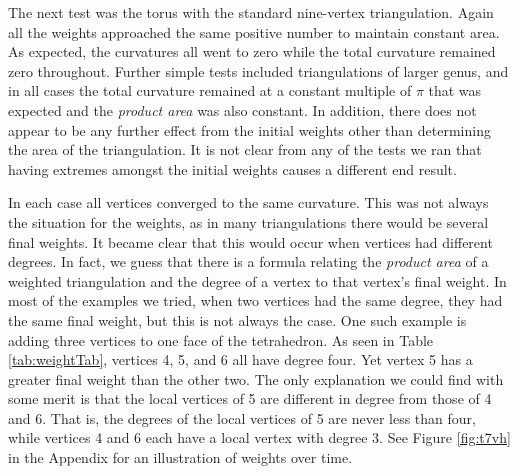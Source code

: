 \documentclass[12pt]{article}
\begin{document}
\noindent The next test was the torus with the standard nine-vertex triangulation. Again all the weights approached the same positive number to maintain constant area. As expected, the curvatures all went to zero while the total curvature remained zero throughout. Further simple tests included triangulations of larger genus, and in all cases the total curvature remained at a constant multiple of $\pi$ that was expected and the \textit{product area} was also constant. In addition, there does not appear to be any further effect from the initial weights other than determining the area of the triangulation. It is not clear from any of the tests we ran that having extremes amongst the initial weights causes a different end result.\newline

\noindent In each case all vertices converged to the same curvature. This was not always the situation for the weights, as in many triangulations there would be several final weights. It became clear that this would occur when vertices had different degrees. In fact, we guess that there is a formula relating the \textit{product area} of a weighted triangulation and the degree of a vertex to that vertex's final weight. In most of the examples we tried, when two vertices had the same degree, they had the same final weight, but this is not always the case. One such example is adding three vertices to one face of the tetrahedron. As seen in Table \ref{tab:weightTab}, vertices 4, 5, and 6 all have degree four. Yet vertex 5 has a greater final weight than the other two. The only explanation we could find with some merit is that the local vertices of 5 are different in degree from those of 4 and 6. That is, the degrees of the local vertices of 5 are never less than four, while vertices 4 and 6 each have a local vertex with degree 3. See Figure \ref{fig:t7vh} in the Appendix for an illustration of weights over time.\newline 
\end{document}
